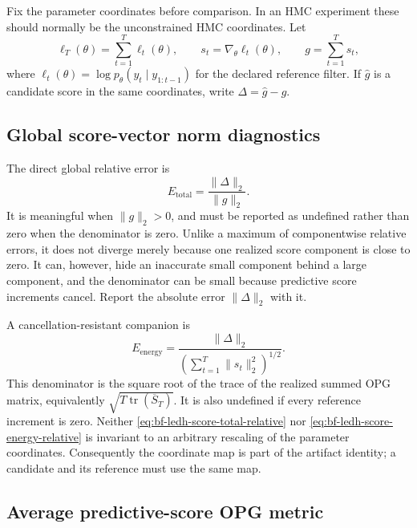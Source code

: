 Fix the parameter coordinates before comparison.  In an HMC experiment these
should normally be the unconstrained HMC coordinates.  Let
\begin{equation}
  \ell_T(\theta)=\sum_{t=1}^T \ell_t(\theta),\qquad
  s_t=\nabla_\theta\ell_t(\theta),\qquad
  g=\sum_{t=1}^T s_t,
  \label{eq:bf-ledh-score-increments}
\end{equation}
where
\(\ell_t(\theta)=\log p_\theta(y_t\mid y_{1:t-1})\) for the declared
reference filter.  If \(\widehat g\) is a candidate score in the same
coordinates, write \(\Delta=\widehat g-g\).

\subsection{Global score-vector norm diagnostics}

The direct global relative error is
\begin{equation}
  E_{\mathrm{total}}
  =\frac{\lVert\Delta\rVert_2}{\lVert g\rVert_2}.
  \label{eq:bf-ledh-score-total-relative}
\end{equation}
It is meaningful when \(\lVert g\rVert_2>0\), and must be reported as
undefined rather than zero when the denominator is zero.  Unlike a maximum of
componentwise relative errors, it does not diverge merely because one realized
score component is close to zero.  It can, however, hide an inaccurate small
component behind a large component, and the denominator can be small because
predictive score increments cancel.  Report the absolute error
\(\lVert\Delta\rVert_2\) with it.

A cancellation-resistant companion is
\begin{equation}
  E_{\mathrm{energy}}
  =\frac{\lVert\Delta\rVert_2}
  {\left(\sum_{t=1}^T\lVert s_t\rVert_2^2\right)^{1/2}}.
  \label{eq:bf-ledh-score-energy-relative}
\end{equation}
This denominator is the square root of the trace of the realized summed OPG
matrix, equivalently \(\sqrt{T\operatorname{tr}(\overline S_T)}\).
It is also undefined if every reference increment is zero.  Neither
\eqref{eq:bf-ledh-score-total-relative} nor
\eqref{eq:bf-ledh-score-energy-relative} is invariant to an arbitrary
rescaling of the parameter coordinates.  Consequently the coordinate map is
part of the artifact identity; a candidate and its reference must use the same
map.

\subsection{Average predictive-score OPG metric}

